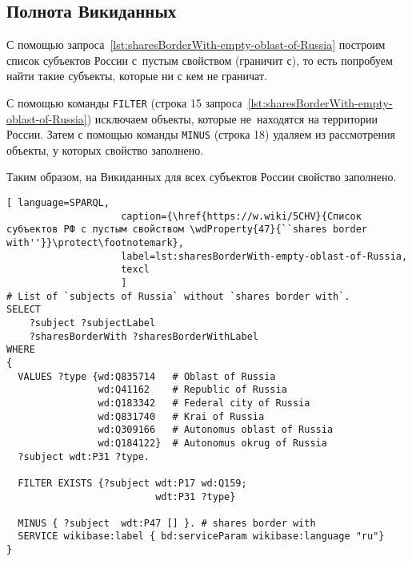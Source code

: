 \newpage
\subsection{Полнота Викиданных}

С помощью запроса~\ref{lst:sharesBorderWith-empty-oblast-of-Russia} 
построим список субъектов России 
с~пустым свойством  (граничит с), 
то есть попробуем найти такие субъекты, которые ни с кем не граничат.

\label{question:q_subjects_of_Russia_2}


С помощью команды \lstinline|FILTER| (строка 15 запроса~\ref{lst:sharesBorderWith-empty-oblast-of-Russia}) 
исключаем объекты, которые не~находятся на территории России. 
Затем с помощью команды \lstinline|MINUS| (строка 18) удаляем из рассмотрения объекты, 
у которых свойство  заполнено.

Таким образом, на Викиданных для всех субъектов России свойство  заполнено.

\lstset{numbers=left, firstnumber=1, frame=single}
\begin{lstlisting}[ language=SPARQL, 
                    caption={\href{https://w.wiki/5CHV}{Список субъектов РФ с пустым свойством \wdProperty{47}{``shares border with''}}\protect\footnotemark},
                    label=lst:sharesBorderWith-empty-oblast-of-Russia,
                    texcl 
                    ]
# List of `subjects of Russia` without `shares border with`. 
SELECT 
    ?subject ?subjectLabel 
    ?sharesBorderWith ?sharesBorderWithLabel
WHERE
{
  VALUES ?type {wd:Q835714   # Oblast of Russia
                wd:Q41162    # Republic of Russia
                wd:Q183342   # Federal city of Russia
                wd:Q831740   # Krai of Russia
                wd:Q309166   # Autonomus oblast of Russia
                wd:Q184122}  # Autonomus okrug of Russia
  ?subject wdt:P31 ?type.
  
  FILTER EXISTS {?subject wdt:P17 wd:Q159; 
                          wdt:P31 ?type}
  
  MINUS { ?subject  wdt:P47 [] }. # shares border with 
  SERVICE wikibase:label { bd:serviceParam wikibase:language "ru"}
}
\end{lstlisting}%




